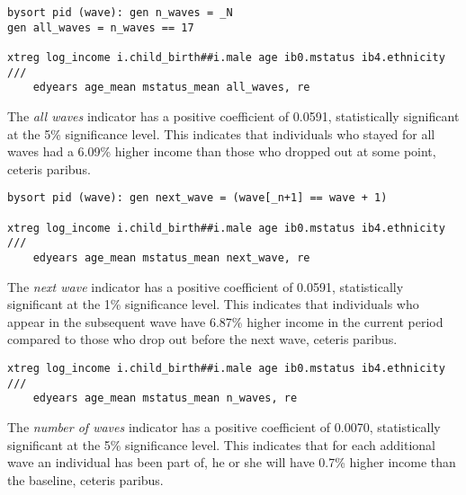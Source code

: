 

\begin{verbatim}
bysort pid (wave): gen n_waves = _N
gen all_waves = n_waves == 17

xtreg log_income i.child_birth##i.male age ib0.mstatus ib4.ethnicity ///
    edyears age_mean mstatus_mean all_waves, re
\end{verbatim}


The \emph{all waves} indicator has a positive coefficient of 0.0591, statistically significant at the 5\% significance level. This indicates that individuals who stayed for all waves had a 6.09\% higher income than those who dropped out at some point, ceteris paribus.

\begin{verbatim}
bysort pid (wave): gen next_wave = (wave[_n+1] == wave + 1)

xtreg log_income i.child_birth##i.male age ib0.mstatus ib4.ethnicity ///
    edyears age_mean mstatus_mean next_wave, re
\end{verbatim}


The \emph{next wave} indicator has a positive coefficient of 0.0591, statistically significant at the 1\% significance level. This indicates that individuals who appear in the subsequent wave have 6.87\% higher income in the current period compared to those who drop out before the next wave, ceteris paribus.

\begin{verbatim}
xtreg log_income i.child_birth##i.male age ib0.mstatus ib4.ethnicity ///
    edyears age_mean mstatus_mean n_waves, re
\end{verbatim}

The \emph{number of waves} indicator has a positive coefficient of 0.0070, statistically significant at the 5\% significance level. This indicates that for each additional wave an individual has been part of, he or she will have 0.7\% higher income than the baseline, ceteris paribus.

